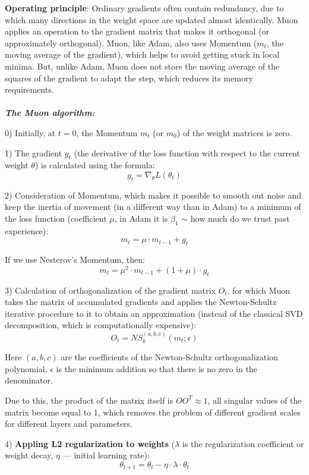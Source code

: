 \documentclass{report}
\begin{document}
\textbf{Operating principle}: 
Ordinary gradients often contain redundancy, due to which many directions in the weight space are updated almost identically. Muon applies an operation to the gradient matrix that makes it orthogonal (or approximately orthogonal). Muon, like Adam, also uses Momentum ($m_t$, the moving average of the gradient), which helps to avoid getting stuck in local minima. But, unlike Adam, Muon does not store the moving average of the squares of the gradient to adapt the step, which reduces its memory requirements.
\\\\
\textit{\textbf{The Muon algorithm:}}

0) Initially, at $t=0$, the Momentum $m_t$ (or $m_0$) of the weight matrices is zero.

1) The gradient $g_t$ (the derivative of the loss function with respect to the current weight $\theta$) is calculated using the formula:
    $$g_t = \nabla_{\theta}L(\theta_t)$$
    
2) Consideration of Momentum, which makes it possible to smooth out noise and keep the inertia of movement (in a different way than in Adam) to a minimum of the loss function (coefficient $\mu$, in Adam it is $\beta_1$ $\sim$ how much do we trust past experience):
    $$m_t = \mu \cdot m_{t-1} + g_t$$

    If we use Nesterov's Momentum, then:
    $$m_t = \mu^2 \cdot m_{t-1} + (1 + \mu) \cdot g_t$$
    
3) Calculation of orthogonalization of the gradient matrix $O_t$, for which Muon takes the matrix of accumulated gradients and applies the Newton-Schultz iterative procedure to it to obtain an approximation (instead of the classical SVD decomposition, which is computationally expensive):
    $$O_t = NS_k^{(a,b,c)}(m_t; \epsilon)$$
    
    Here $(a,b,c)$ are the coefficients of the Newton-Schultz orthogonalization polynomial, $\epsilon$ is the minimum addition so that there is no zero in the denominator.
    
    Due to this, the product of the matrix itself is $OO^T \approx 1$, all singular values of the matrix become equal to 1, which removes the problem of different gradient scales for different layers and parameters.
    
4) \textbf{Appling L2 regularization to weights} ($\lambda$ is the regularization coefficient or weight decay, $\eta$ — initial learning rate):
    $$\theta_{t+1} = \theta_{t} - \eta \cdot \lambda \cdot \theta_{t}$$
\end{document}
